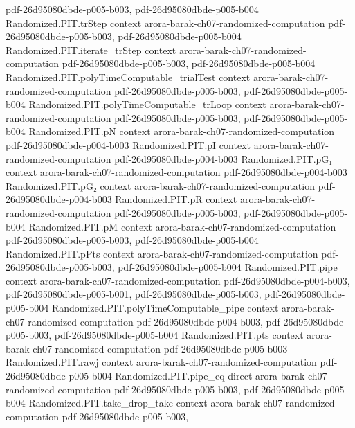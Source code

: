 \begin{theorem}
  {pdf-26d95080dbde-p005-b003,
    pdf-26d95080dbde-p005-b004}
\proofstep
  {Randomized.PIT.trStep}
  {context}
  {arora-barak-ch07-randomized-computation}
  {pdf-26d95080dbde-p005-b003,
    pdf-26d95080dbde-p005-b004}
\proofstep
  {Randomized.PIT.iterate_trStep}
  {context}
  {arora-barak-ch07-randomized-computation}
  {pdf-26d95080dbde-p005-b003,
    pdf-26d95080dbde-p005-b004}
\proofstep
  {Randomized.PIT.polyTimeComputable_trialTest}
  {context}
  {arora-barak-ch07-randomized-computation}
  {pdf-26d95080dbde-p005-b003,
    pdf-26d95080dbde-p005-b004}
\proofstep
  {Randomized.PIT.polyTimeComputable_trLoop}
  {context}
  {arora-barak-ch07-randomized-computation}
  {pdf-26d95080dbde-p005-b003,
    pdf-26d95080dbde-p005-b004}
\proofstep
  {Randomized.PIT.pN}
  {context}
  {arora-barak-ch07-randomized-computation}
  {pdf-26d95080dbde-p004-b003}
\proofstep
  {Randomized.PIT.pI}
  {context}
  {arora-barak-ch07-randomized-computation}
  {pdf-26d95080dbde-p004-b003}
\proofstep
  {Randomized.PIT.pG₁}
  {context}
  {arora-barak-ch07-randomized-computation}
  {pdf-26d95080dbde-p004-b003}
\proofstep
  {Randomized.PIT.pG₂}
  {context}
  {arora-barak-ch07-randomized-computation}
  {pdf-26d95080dbde-p004-b003}
\proofstep
  {Randomized.PIT.pR}
  {context}
  {arora-barak-ch07-randomized-computation}
  {pdf-26d95080dbde-p005-b003,
    pdf-26d95080dbde-p005-b004}
\proofstep
  {Randomized.PIT.pM}
  {context}
  {arora-barak-ch07-randomized-computation}
  {pdf-26d95080dbde-p005-b003,
    pdf-26d95080dbde-p005-b004}
\proofstep
  {Randomized.PIT.pPts}
  {context}
  {arora-barak-ch07-randomized-computation}
  {pdf-26d95080dbde-p005-b003,
    pdf-26d95080dbde-p005-b004}
\proofstep
  {Randomized.PIT.pipe}
  {context}
  {arora-barak-ch07-randomized-computation}
  {pdf-26d95080dbde-p004-b003,
    pdf-26d95080dbde-p005-b001,
    pdf-26d95080dbde-p005-b003,
    pdf-26d95080dbde-p005-b004}
\proofstep
  {Randomized.PIT.polyTimeComputable_pipe}
  {context}
  {arora-barak-ch07-randomized-computation}
  {pdf-26d95080dbde-p004-b003,
    pdf-26d95080dbde-p005-b003,
    pdf-26d95080dbde-p005-b004}
\proofstep
  {Randomized.PIT.pts}
  {context}
  {arora-barak-ch07-randomized-computation}
  {pdf-26d95080dbde-p005-b003}
\proofstep
  {Randomized.PIT.rawj}
  {context}
  {arora-barak-ch07-randomized-computation}
  {pdf-26d95080dbde-p005-b004}
\proofstep
  {Randomized.PIT.pipe_eq}
  {direct}
  {arora-barak-ch07-randomized-computation}
  {pdf-26d95080dbde-p005-b003,
    pdf-26d95080dbde-p005-b004}
\proofstep
  {Randomized.PIT.take_drop_take}
  {context}
  {arora-barak-ch07-randomized-computation}
  {pdf-26d95080dbde-p005-b003,
}
\end{theorem}
